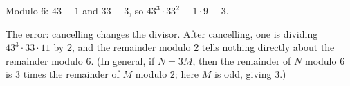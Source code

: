 Modulo $6$: $43\equiv1$ and $33\equiv3$, so $43^3\cdot33^2\equiv1\cdot9\equiv\boxed{3}$.

The error: cancelling changes the divisor. After cancelling, one is dividing $43^3\cdot33\cdot11$ by $2$, and the remainder modulo $2$ tells nothing directly about the remainder modulo $6$. (In general, if $N=3M$, then the remainder of $N$ modulo $6$ is $3$ times the remainder of $M$ modulo $2$; here $M$ is odd, giving $3$.)
